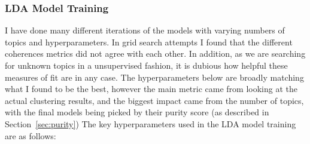 \documentclass[12pt]{article}
\begin{document}
\subsubsection*{LDA Model Training}

I have done many different iterations of the models with varying numbers of topics and
hyperparameters. In grid search attempts I found that the different coherences metrics did not agree
with each other. In addition, as we are searching for unknown topics in a unsupervised fashion, it
is dubious how helpful these measures of fit are in any case. The hyperparameters below are broadly
matching what I found to be the best, however the main metric came from looking at the actual
clustering results, and the biggest impact came from the number of topics, with the final models
being picked by their purity score (as described in Section~\ref{sec:purity}) The key
hyperparameters used in the LDA model training are as follows:
\end{document}
